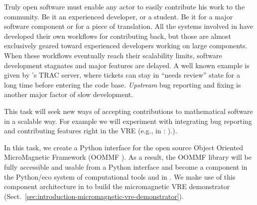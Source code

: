 \begin{workpackage}[id=component-architecture,wphases=0-48!.5,
  title=Component Architecture,lead=UV,
  PSRM=46,UVRM=8,SARM=16, USORM=6, UORM=19, LLRM=14, UJFRM=6, UGRM=14]
\begin{tasklist}
  \begin{task}[title=Improving the development workflow in mathematical software,id=workflow,lead=UV,PM=10,partners={PS,LL,UG},wphases=6-24,issue=56]
    Truly open software must enable any actor to easily contribute his
    work to the community. Be it an experienced developer, or a
    student. Be it for a major software component or for a piece of
    translation. All the systems involved in \TheProject have
    developed their own workflows for contributing back, but those are
    almost exclusively geared toward experienced developers working on
    large components. When these workflows eventually reach their
    scalability limits, software development stagnates and major
    features are delayed. A well known example is given by \Sage's TRAC
    server, where tickets can stay in ``needs review'' state for a
    long time before entering the code base.  \emph{Upstream} bug
    reporting and fixing is another major factor of slow development.

    This task will seek new ways of accepting contributions to
    mathematical software in a scalable way. For example we will
    experiment with integrating bug reporting and contributing
    features right in the VRE (e.g., in \SMC:
    ).).

  \end{task}


\begin{task}[lead=USO,id=oommf-python-interface,title=Python interface for OOMMF micromagnetic simulation library,PM=6,wphases=7-13,partners={SA},issue=57]
  In this task, we create a Python interface
  for the open source Object
  Oriented MicroMagnetic Framework (OOMMF \cite{OOMMF-url}).
  As a result, the OOMMF library will be fully accessible and usable
  from a Python interface and become a component in the
  Python/\Jupyter eco system of computational tools and in
  \TheProject. We make use of this component architecture in
   to build the micromagnetic
  VRE demonstrator
  (Sect.~\ref{sec:introduction-micromagnetic-vre-demonstrator}).


\end{task}
\end{tasklist}
\end{workpackage}
